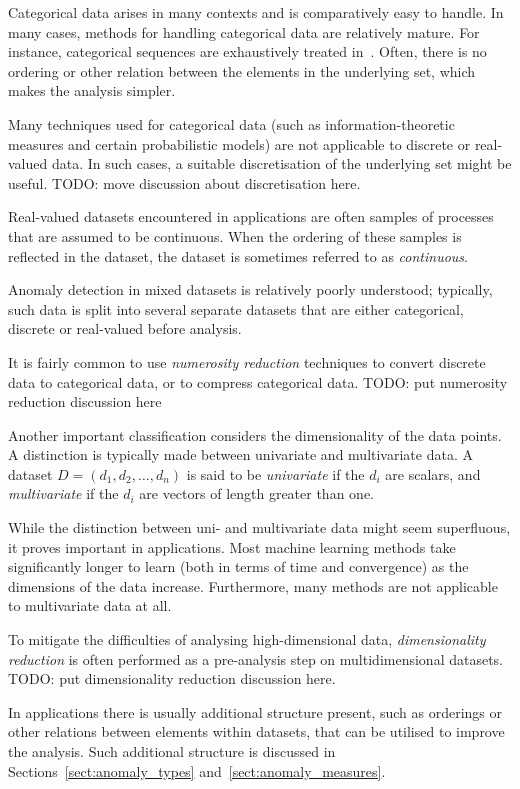 Categorical data arises in many contexts and is comparatively easy to handle. In many cases, methods for handling categorical data are relatively mature. For instance, categorical sequences are exhaustively treated in~\cite{TODO}. Often, there is no ordering or other relation between the elements in the underlying set, which makes the analysis simpler.

Many techniques used for categorical data (such as information-theoretic measures and certain probabilistic models) are not applicable to discrete or real-valued data. In such cases, a suitable discretisation of the underlying set might be useful. TODO: move discussion about discretisation here.

Real-valued datasets encountered in applications are often samples of processes that are assumed to be continuous. When the ordering of these samples is reflected in the dataset, the dataset is sometimes referred to as \emph{continuous}.

Anomaly detection in mixed datasets is relatively poorly understood; typically, such data is split into several separate datasets that are either categorical, discrete or real-valued before analysis.

It is fairly common to use \emph{numerosity reduction} techniques to convert discrete data to categorical data, or to compress categorical data. TODO: put numerosity reduction discussion here

Another important classification considers the dimensionality of the data points. A distinction is typically made between univariate and multivariate data. A dataset $D = (d_1, d_2, \dots, d_n)$ is said to be \emph{univariate} if the $d_i$ are scalars, and \emph{multivariate} if the $d_i$ are vectors of length greater than one.

While the distinction between uni- and multivariate data might seem superfluous, it proves important in applications. Most machine learning methods take significantly longer to learn (both in terms of time and convergence) as the dimensions of the data increase. Furthermore, many methods are not applicable to multivariate data at all.

To mitigate the difficulties of analysing high-dimensional data, \emph{dimensionality reduction} is often performed as a pre-analysis step on multidimensional datasets. TODO: put dimensionality reduction discussion here.

In applications there is usually additional structure present, such as orderings or other relations between elements within datasets, that can be utilised to improve the analysis. Such additional structure is discussed in Sections~\ref{sect:anomaly_types} and~\ref{sect:anomaly_measures}.

